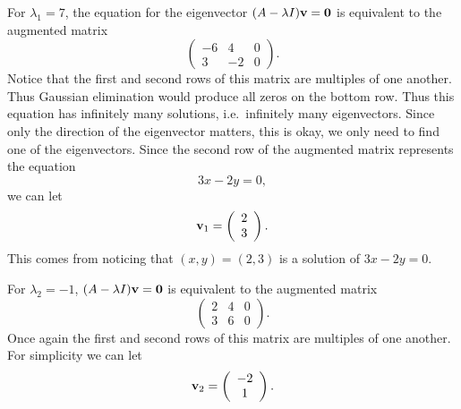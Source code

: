 For $\lambda_1 = 7$, the equation for the eigenvector
$(A - \lambda I) \mathbf{v} = \mathbf{0}$ is equivalent
to the augmented matrix
\begin{equation}\label{eveqn}
\left(\begin{array}{cc|c} -6 & 4 & 0\\
                             3 & -2 & 0
                    \end{array} \right) .
\end{equation}
Notice that the first and second rows of this matrix are multiples of
one another. Thus Gaussian elimination would produce all zeros on the bottom row.
Thus this equation has infinitely many solutions, i.e.~infinitely
many eigenvectors. Since only the direction of the eigenvector matters, this is okay,
we only need to find one of the eigenvectors. Since the second row of the augmented
matrix represents the equation
$$
               3 x - 2 y = 0,
$$
we can let
$$
     \mathbf{v}_1 = \left(\begin{array}{c} 2 \\
                             3
                    \end{array} \right).
$$
This comes from noticing that $(x,y) = (2,3)$ is a solution of
$ 3x -2y =0 $.

For $\lambda_2 = -1$, $(A - \lambda I) \mathbf{v} = \mathbf{0}$ is equivalent
to the augmented matrix
$$
\left(\begin{array}{cc|c} 2 & 4 & 0\\
                             3 & 6 & 0
                    \end{array} \right)
.
$$
Once again the first and second rows of this matrix are multiples of
one another. For simplicity we can
let
$$
     \mathbf{v}_2 = \left(\begin{array}{c} -2 \\
                             1
                    \end{array} \right).
$$

